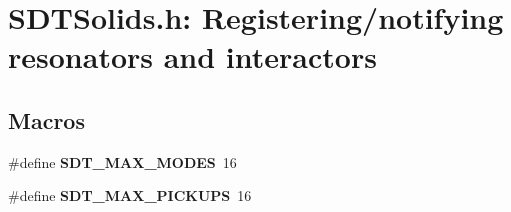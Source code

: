 \hypertarget{group__solids}{}\section{S\+D\+T\+Solids.\+h\+: Registering/notifying resonators and interactors}
\label{group__solids}
\subsection*{Macros}
\begin{DoxyCompactItemize}
\item 
\hypertarget{group__solids_ga4798bf3097d15ac12831bffa616ab71f}{}\#define {\bfseries S\+D\+T\+\_\+\+M\+A\+X\+\_\+\+M\+O\+D\+E\+S}~16\label{group__solids_ga4798bf3097d15ac12831bffa616ab71f}

\item 
\hypertarget{group__solids_ga4920a8283b4fa0d571a031e751fe9f86}{}\#define {\bfseries S\+D\+T\+\_\+\+M\+A\+X\+\_\+\+P\+I\+C\+K\+U\+P\+S}~16\label{group__solids_ga4920a8283b4fa0d571a031e751fe9f86}

\end{DoxyCompactItemize}
